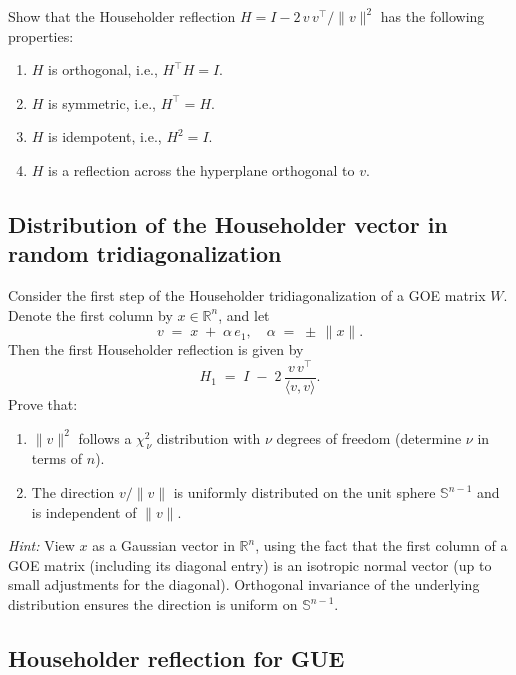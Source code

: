 \documentclass[letterpaper,11pt,oneside,reqno]{article}
\numberwithin{equation}{section}
\theoremstyle{definition}
\begin{document}
Show that the Householder reflection \(H = I - 2\,v\,v^\top/\|v\|^2\) has the following properties:
\begin{enumerate}
	\item \(H\) is orthogonal, i.e., \(H^\top H = I\).
	\item \(H\) is symmetric, i.e., \(H^\top = H\).
	\item \(H\) is idempotent, i.e., \(H^2 = I\).
	\item \(H\) is a reflection across the hyperplane orthogonal to \(v\).
\end{enumerate}

\subsection{Distribution of the Householder vector in random tridiagonalization}
\label{prob:householder-vector}

Consider the first step of the Householder tridiagonalization of a GOE matrix \(W\). Denote the first column by \(x \in \mathbb{R}^n\), and let
\[
   v \;=\; x \;+\;\alpha \,e_1,\quad
   \alpha \;=\; \pm\,\|x\|.
\]
Then the first Householder reflection is given by
\[
   H_1 \;=\; I \;-\; 2 \,\frac{v\,v^\top}{\langle v,v\rangle}.
\]
Prove that:
\begin{enumerate}
  \item \(\|v\|^2\) follows a \(\chi^2_{\,\nu}\) distribution with \(\nu\) degrees of freedom (determine \(\nu\) in terms of \(n\)).
  \item The direction \(v / \|v\|\) is uniformly distributed on the unit sphere \(\mathbb{S}^{n-1}\) and is independent of \(\|v\|\).
\end{enumerate}

\medskip
\noindent
\emph{Hint:}
View \(x\) as a Gaussian vector in \(\mathbb{R}^n\), using the fact that the first column of a GOE matrix (including its diagonal entry) is an isotropic normal vector (up to small adjustments for the diagonal). Orthogonal invariance of the underlying distribution ensures the direction is uniform on \(\mathbb{S}^{n-1}\).

\subsection{Householder reflection for GUE}
\end{document}

